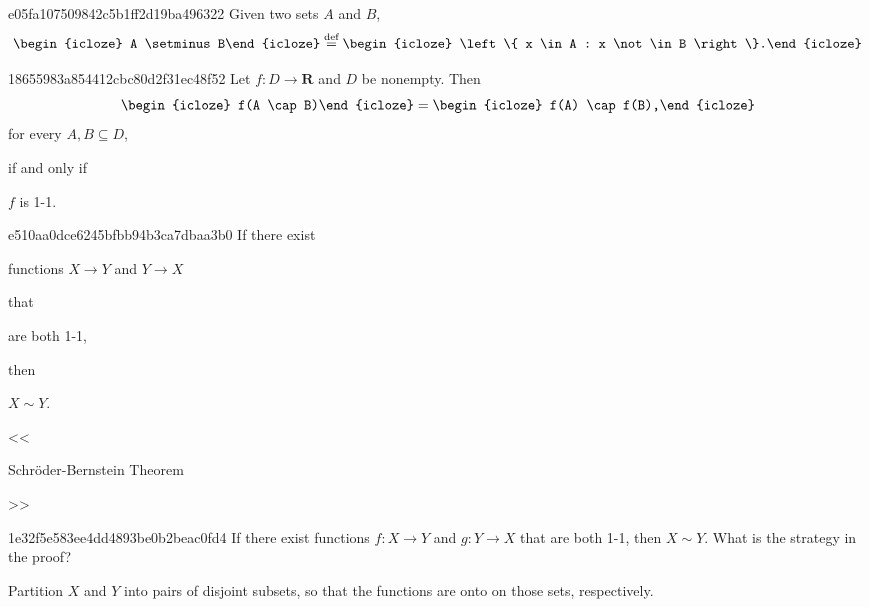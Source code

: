 \begin{note}{e05fa107509842c5b1ff2d19ba496322}
    Given two sets \({ A }\) and \({ B }\),
    \[
        \begin{icloze}{2}A \setminus B\end{icloze} \overset{\text{def}}= \begin{icloze}{1}\left\{ x \in A : x \not\in B \right\}.\end{icloze}
    \]
\end{note}

\begin{note}{18655983a854412cbc80d2f31ec48f52}
    Let \({ f : D \to \mathbf{R} }\) and \({ D }\) be nonempty.
    Then
    \[
        \begin{icloze}{4}f(A \cap B)\end{icloze} = \begin{icloze}{2}f(A) \cap f(B),\end{icloze}
    \]
    for every \({ A, B \subseteq D }\), \begin{icloze}{3}if and only if\end{icloze} \begin{icloze}{1}\({ f }\) is 1-1.\end{icloze}
\end{note}

\begin{note}{e510aa0dce6245bfbb94b3ca7dbaa3b0}
    If there exist \begin{icloze}{2}functions \({ X \to Y }\) and \({ Y \to X }\)\end{icloze} that \begin{icloze}{1}are both 1-1,\end{icloze} then \begin{icloze}{4}\({ X \sim Y }\).\end{icloze}

    \begin{center}
        \tiny
        <<\begin{icloze}{3}Schröder-Bernstein Theorem\end{icloze}>>
    \end{center}
\end{note}

\begin{note}{1e32f5e583ee4dd4893be0b2beac0fd4}
    If there exist functions \({ f : X \to Y }\) and \({ g : Y \to X }\) that are both 1-1, then \({ X \sim Y }\).
    What is the strategy in the proof?

    \begin{cloze}{1}
        Partition \({ X }\) and \({ Y }\) into pairs of disjoint subsets, so that the functions are onto on those sets, respectively.
    \end{cloze}
\end{note}

